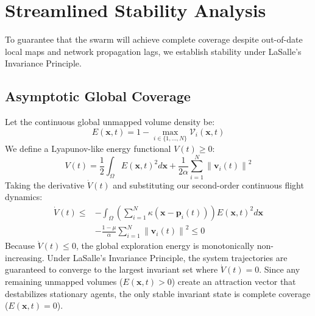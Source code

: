 \documentclass[letterpaper, 10pt, conference]{IEEEtran}
\newcommand{\norm}[1]{\left\lVert#1\right\rVert}
\begin{document}
\section{Streamlined Stability Analysis}
\label{sec:theory}

To guarantee that the swarm will achieve complete coverage despite out-of-date local maps and network propagation lags, we establish stability under LaSalle's Invariance Principle.

\subsection{Asymptotic Global Coverage}
Let the continuous global unmapped volume density be:
\begin{equation}
    E(\mathbf{x}, t) = 1 - \max_{i \in \{1,\dots,N\}} \mathcal{V}_i(\mathbf{x}, t)
\end{equation}
We define a Lyapunov-like energy functional $V(t) \geq 0$:
\begin{equation}
    V(t) = \frac{1}{2} \int_{\Omega} E(\mathbf{x}, t)^2 d\mathbf{x} + \frac{1}{2\alpha} \sum_{i=1}^N \norm{\mathbf{v}_i(t)}^2
\end{equation}
Taking the derivative $\dot{V}(t)$ and substituting our second-order continuous flight dynamics:
\begin{align}
    \dot{V}(t) \leq & -\int_{\Omega} \left( \sum_{i=1}^N \kappa(\mathbf{x} - \mathbf{p}_i(t)) \right) E(\mathbf{x}, t)^2 d\mathbf{x} \nonumber \\
    & - \frac{1 - \mu}{\alpha} \sum_{i=1}^N \norm{\mathbf{v}_i(t)}^2 \leq 0
\end{align}
Because $\dot{V}(t) \leq 0$, the global exploration energy is monotonically non-increasing. Under LaSalle's Invariance Principle, the system trajectories are guaranteed to converge to the largest invariant set where $\dot{V}(t) = 0$. Since any remaining unmapped volumes ($E(\mathbf{x}, t) > 0$) create an attraction vector that destabilizes stationary agents, the only stable invariant state is complete coverage ($E(\mathbf{x}, t) = 0$).
\end{document}
